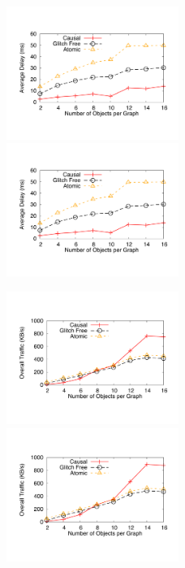 \documentclass[11pt]{article}
\begin{document}
\begin{figure}
	\includegraphics[width=0.5\textwidth]{graphs/numGraphNodesDelay}
	\includegraphics[width=0.5\textwidth]{referencegraphs/numGraphNodesDelay}
\end{figure}
\begin{figure}
	\includegraphics[width=0.5\textwidth]{graphs/numGraphNodesTraffic}
	\includegraphics[width=0.5\textwidth]{referencegraphs/numGraphNodesTraffic}
\end{figure}
\end{document}
